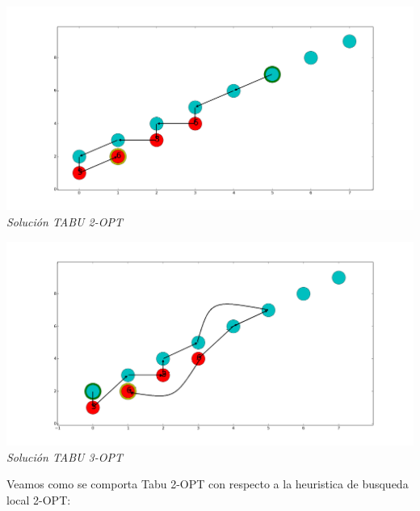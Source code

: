 \vspace*{0.3cm} \vspace*{0.3cm}
  \begin{center}
 \includegraphics[scale=0.3]{./EJ4/fam62opt.png}\\
 {            \textit{Soluci\'on TABU 2-OPT}}
  \end{center}
  \vspace*{0.3cm}

\vspace*{0.3cm} \vspace*{0.3cm}
  \begin{center}
 \includegraphics[scale=0.3]{./EJ4/fam63opt.png}\\
 {            \textit{Soluci\'on TABU 3-OPT}}
  \end{center}
  \vspace*{0.3cm}

Veamos como se comporta Tabu 2-OPT con respecto a la heuristica de busqueda local 2-OPT:

